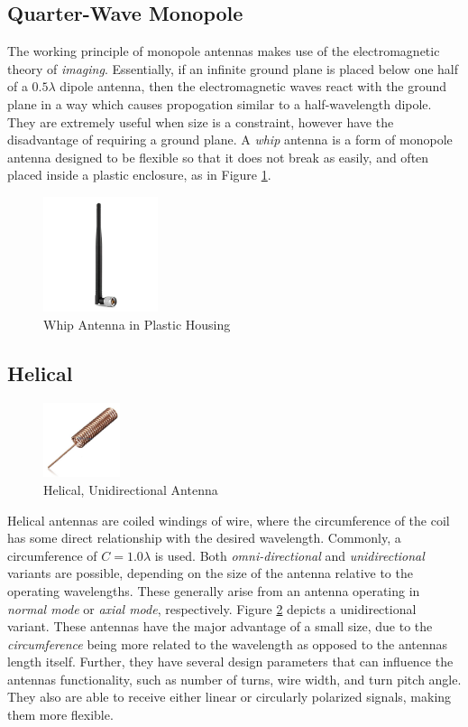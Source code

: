 \subsection{Quarter-Wave Monopole}
The working principle of monopole antennas makes use of the electromagnetic theory of \textit{imaging}. Essentially, if an infinite ground plane is placed below one half of a $0.5 \lambda$ dipole antenna, then the electromagnetic waves react with the ground plane in a way which causes propogation similar to a half-wavelength dipole. They are extremely useful when size is a constraint, however have the disadvantage of requiring a ground plane. A \textit{whip} antenna is a form of monopole antenna designed to be flexible so that it does not break as easily, and often placed inside a plastic enclosure, as in Figure \ref{fig:whip}.

\begin{figure}[!htb]
  \centering
  \includegraphics[width=0.3\textwidth]{whip}
  \caption{Whip Antenna in Plastic Housing}
  \label{fig:whip}
\end{figure}

\subsection{Helical}
\begin{figure}[!htb]
  \centering
  \includegraphics[width=0.2\textwidth]{helical_uni}
  \caption{Helical, Unidirectional Antenna}
  \label{fig:helical_uni}
\end{figure}

Helical antennas are coiled windings of wire, where the circumference of the coil has some direct relationship with the desired wavelength. Commonly, a circumference of $C = 1.0 \lambda$ is used. Both \textit{omni-directional} and \textit{unidirectional} variants are possible, depending on the size of the antenna relative to the operating wavelengths. These generally arise from an antenna operating in \textit{normal mode} or \textit{axial mode}, respectively. Figure \ref{fig:helical_uni} depicts a unidirectional variant. These antennas have the major advantage of a small size, due to the \textit{circumference} being more related to the wavelength as opposed to the antennas length itself. Further, they have several design parameters that can influence the antennas functionality, such as number of turns, wire width, and turn pitch angle. They also are able to receive either linear or circularly polarized signals, making them more flexible.


